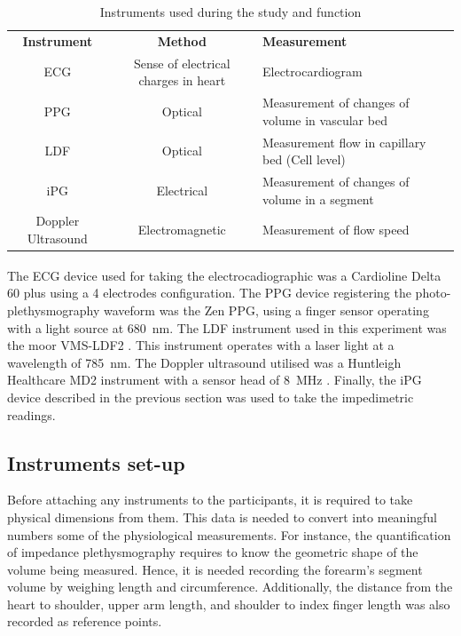 \begin{table}
	\caption{Instruments used during the study and function}
	\centering
	\label{table:instruments}
	\begin{tabu}{ccp{4.5cm}}
		\hline 
		\textbf{Instrument} & \textbf{Method} & \textbf{Measurement} \\\tabucline[2pt]{-}
		ECG & Sense of electrical charges in heart & Electrocardiogram \\\hline 
		PPG & Optical & Measurement of changes of volume in vascular bed \\\hline 
		LDF & Optical & Measurement flow in capillary bed (Cell level) \\\hline 
		iPG & Electrical & Measurement of changes of volume in a segment \\\hline
		Doppler Ultrasound & Electromagnetic & Measurement of flow speed \\\hline 
	\end{tabu}  
\end{table}

The ECG device used for taking the electrocadiographic was a Cardioline\textsuperscript{\textregistered} Delta 60 plus \cite{remco:delta60} using a 4 electrodes configuration. The PPG device registering the photo-plethysmography waveform was the Zen PPG, using a finger sensor operating with a light source at \SI{680}{\nano\meter}.  The LDF instrument used in this experiment was the moor VMS-LDF2 \cite{moor:LDF2}. This instrument operates with a laser light at a wavelength of \SI{785}{\nano\meter}. The Doppler ultrasound utilised was a Huntleigh Healthcare MD2 instrument with a sensor head of \SI{8}{\mega\hertz} \cite{ht:MD2}. Finally, the iPG device described in the previous section was used to take the impedimetric readings. 

\subsection{Instruments set-up}
\label{section procedure 1.1}

Before attaching any instruments to the participants, it is required to take physical dimensions from them. This data is needed to convert into meaningful numbers some of the physiological measurements. For instance, the quantification of impedance plethysmography requires to know the geometric shape of the volume being measured. Hence, it is needed recording the forearm's segment volume by weighing length and circumference. Additionally, the distance from the heart to shoulder, upper arm length, and shoulder to index finger length was also recorded as reference points. 

